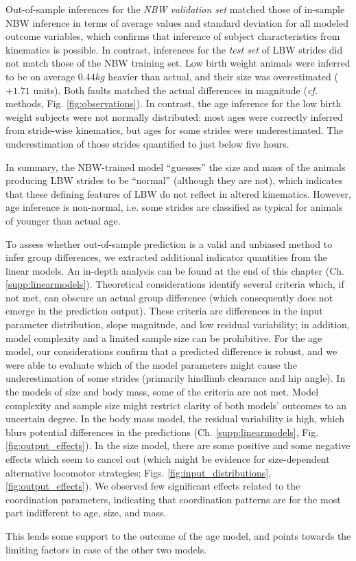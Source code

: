 Out-of-sample inferences for the \emph{NBW validation set} matched those of in-sample NBW inference in terms of average values and standard deviation for all modeled outcome variables, which confirms that inference of subject characteristics from kinematics is possible.
In contrast, inferences for the \emph{test set} of LBW strides did not match those of the NBW training set.
Low birth weight animals were inferred to be on average \(0.44 kg\) heavier than actual, and their size was overestimated (\(+1.71\)
units).
Both faults matched the actual differences in magnitude (\emph{cf.} methods, Fig. \ref{fig:observations}).
In contrast, the age inference for the low birth weight subjects were not normally distributed: most ages were correctly inferred from stride-wise kinematics, but ages for some strides were underestimated.
The underestimation of those strides quantified to just below five hours.

In summary, the NBW-trained model ``guesses'' the size and mass of the animals producing LBW strides to be ``normal'' (although they are not), which indicates that these defining features of LBW do not reflect in altered kinematics.
However, age inference is non-normal, i.e. some strides are classified as typical for animals of younger than actual age.
\bigskip

\begin{change}
To assess whether out-of-sample prediction is a valid and unbiased method to infer group differences, we extracted additional indicator quantities from the linear models.
An in-depth analysis can be found at the end of this chapter (Ch. \ref{supp:linearmodels}).
Theoretical considerations identify several criteria which, if not met, can obscure an actual group difference (which consequently does not emerge in the prediction output).
These criteria are differences in the input parameter distribution, slope magnitude, and low residual variability; in addition, model complexity and a limited sample size can be prohibitive.
For the age model, our considerations confirm that a predicted difference is robust, and we were able to evaluate which of the model parameters might cause the underestimation of some strides (primarily hindlimb clearance and hip angle).
In the models of size and body mass, some of the criteria are not met.
Model complexity and sample size might restrict clarity of both models' outcomes to an uncertain degree.
In the body mass model, the residual variability is high, which blurs potential differences in the predictions (Ch. \ref{supp:linearmodels}, Fig. \ref{fig:output_effects}).
In the size model, there are some positive and some negative effects which seem to cancel out (which might be evidence for size-dependent alternative locomotor strategies; Figs. \ref{fig:input_distributions}, \ref{fig:output_effects}).
We observed few significant effects related to the coordination parameters, indicating that coordination patterns are for the most part indifferent to age, size, and mass.


This lends some support to the outcome of the age model, and points towards the limiting factors in case of the other two models.

\end{change}
\bigskip


